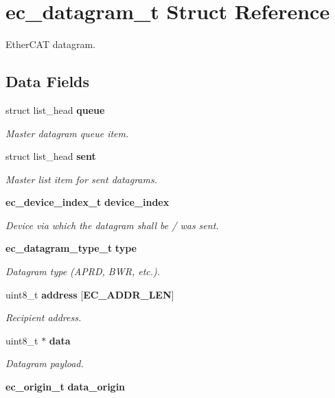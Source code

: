 \section{ec\-\_\-datagram\-\_\-t \-Struct \-Reference}
\label{structec__datagram__t}


\-Ether\-C\-A\-T datagram.  


\subsection*{\-Data \-Fields}
\begin{DoxyCompactItemize}
\item 
struct list\-\_\-head {\bf queue}
\begin{DoxyCompactList}\small\item\em \-Master datagram queue item. \end{DoxyCompactList}\item 
struct list\-\_\-head {\bf sent}
\begin{DoxyCompactList}\small\item\em \-Master list item for sent datagrams. \end{DoxyCompactList}\item 
{\bf ec\-\_\-device\-\_\-index\-\_\-t} {\bf device\-\_\-index}
\begin{DoxyCompactList}\small\item\em \-Device via which the datagram shall be / was sent. \end{DoxyCompactList}\item 
{\bf ec\-\_\-datagram\-\_\-type\-\_\-t} {\bf type}
\begin{DoxyCompactList}\small\item\em \-Datagram type (\-A\-P\-R\-D, \-B\-W\-R, etc.). \end{DoxyCompactList}\item 
uint8\-\_\-t {\bf address} [{\bf \-E\-C\-\_\-\-A\-D\-D\-R\-\_\-\-L\-E\-N}]
\begin{DoxyCompactList}\small\item\em \-Recipient address. \end{DoxyCompactList}\item 
uint8\-\_\-t $\ast$ {\bf data}
\begin{DoxyCompactList}\small\item\em \-Datagram payload. \end{DoxyCompactList}\item 
{\bf ec\-\_\-origin\-\_\-t} {\bf data\-\_\-origin}

\end{DoxyCompactItemize}
